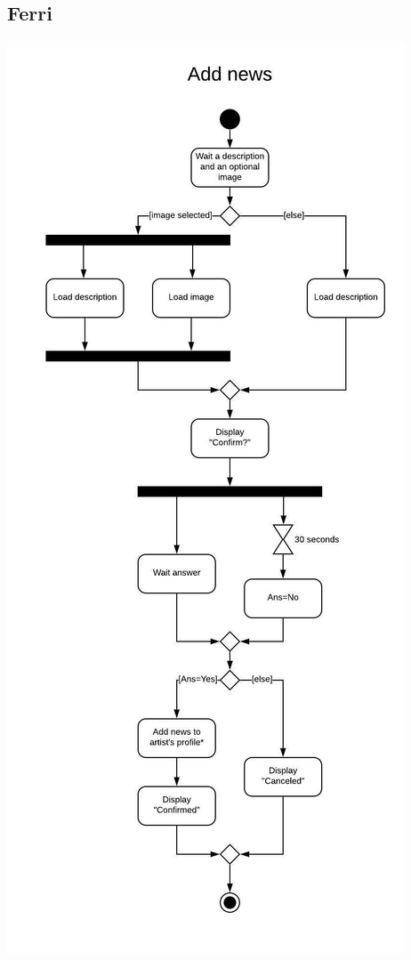 \documentclass[11pt,a4paper]{article}
\begin{document}
\subsection{Ferri}
\includegraphics[scale=0.5]{addnews1.jpeg}
\end{document}
